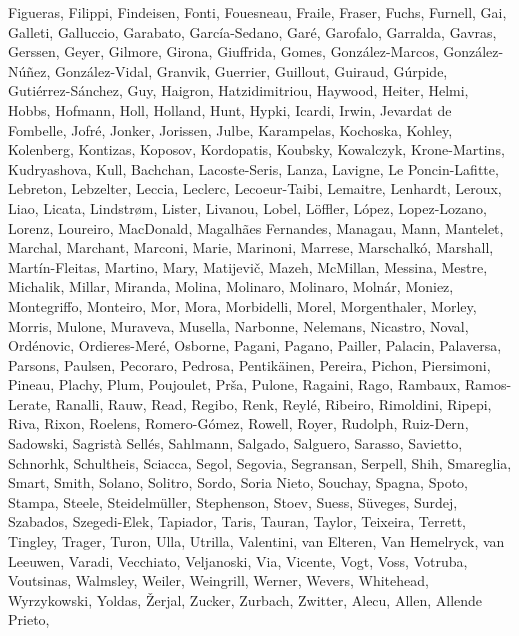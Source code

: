 \documentclass[apj, revtex4-1]{emulateapj}
\begin{document}
\begin{thebibliography}{}
{  Figueras, Filippi, Findeisen, Fonti, Fouesneau, Fraile, Fraser, Fuchs,
  Furnell, Gai, Galleti, Galluccio, Garabato, Garc{\'{i}}a-Sedano, Gar{\'{e}},
  Garofalo, Garralda, Gavras, Gerssen, Geyer, Gilmore, Girona, Giuffrida,
  Gomes, Gonz{\'{a}}lez-Marcos, Gonz{\'{a}}lez-N{\'{u}}{\~{n}}ez,
  Gonz{\'{a}}lez-Vidal, Granvik, Guerrier, Guillout, Guiraud, G{\'{u}}rpide,
  Guti{\'{e}}rrez-S{\'{a}}nchez, Guy, Haigron, Hatzidimitriou, Haywood, Heiter,
  Helmi, Hobbs, Hofmann, Holl, Holland, Hunt, Hypki, Icardi, Irwin, {Jevardat
  de Fombelle}, Jofr{\'{e}}, Jonker, Jorissen, Julbe, Karampelas, Kochoska,
  Kohley, Kolenberg, Kontizas, Koposov, Kordopatis, Koubsky, Kowalczyk,
  Krone-Martins, Kudryashova, Kull, Bachchan, Lacoste-Seris, Lanza, Lavigne,
  {Le Poncin-Lafitte}, Lebreton, Lebzelter, Leccia, Leclerc, Lecoeur-Taibi,
  Lemaitre, Lenhardt, Leroux, Liao, Licata, Lindstr{\o}m, Lister, Livanou,
  Lobel, L{\"{o}}ffler, L{\'{o}}pez, Lopez-Lozano, Lorenz, Loureiro, MacDonald,
  {Magalh{\~{a}}es Fernandes}, Managau, Mann, Mantelet, Marchal, Marchant,
  Marconi, Marie, Marinoni, Marrese, Marschalk{\'{o}}, Marshall,
  Mart{\'{i}}n-Fleitas, Martino, Mary, Matijevi{\v{c}}, Mazeh, McMillan,
  Messina, Mestre, Michalik, Millar, Miranda, Molina, Molinaro, Molinaro,
  Moln{\'{a}}r, Moniez, Montegriffo, Monteiro, Mor, Mora, Morbidelli, Morel,
  Morgenthaler, Morley, Morris, Mulone, Muraveva, Musella, Narbonne, Nelemans,
  Nicastro, Noval, Ord{\'{e}}novic, Ordieres-Mer{\'{e}}, Osborne, Pagani,
  Pagano, Pailler, Palacin, Palaversa, Parsons, Paulsen, Pecoraro, Pedrosa,
  Pentik{\"{a}}inen, Pereira, Pichon, Piersimoni, Pineau, Plachy, Plum,
  Poujoulet, Pr{\v{s}}a, Pulone, Ragaini, Rago, Rambaux, Ramos-Lerate, Ranalli,
  Rauw, Read, Regibo, Renk, Reyl{\'{e}}, Ribeiro, Rimoldini, Ripepi, Riva,
  Rixon, Roelens, Romero-G{\'{o}}mez, Rowell, Royer, Rudolph, Ruiz-Dern,
  Sadowski, {Sagrist{\`{a}} Sell{\'{e}}s}, Sahlmann, Salgado, Salguero,
  Sarasso, Savietto, Schnorhk, Schultheis, Sciacca, Segol, Segovia, Segransan,
  Serpell, Shih, Smareglia, Smart, Smith, Solano, Solitro, Sordo, {Soria
  Nieto}, Souchay, Spagna, Spoto, Stampa, Steele, Steidelm{\"{u}}ller,
  Stephenson, Stoev, Suess, S{\"{u}}veges, Surdej, Szabados, Szegedi-Elek,
  Tapiador, Taris, Tauran, Taylor, Teixeira, Terrett, Tingley, Trager, Turon,
  Ulla, Utrilla, Valentini, van Elteren, {Van Hemelryck}, van Leeuwen, Varadi,
  Vecchiato, Veljanoski, Via, Vicente, Vogt, Voss, Votruba, Voutsinas,
  Walmsley, Weiler, Weingrill, Werner, Wevers, Whitehead, Wyrzykowski, Yoldas,
  {\v{Z}}erjal, Zucker, Zurbach, Zwitter, Alecu, Allen, {Allende Prieto},
}
\end{thebibliography}
\end{document}
